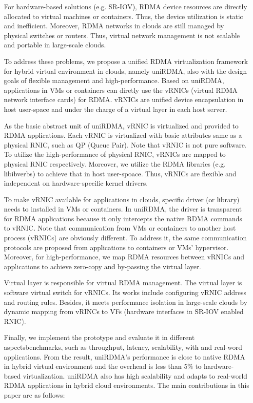 For hardware-based solutions (e.g. SR-IOV), RDMA device resources are directly allocated to virtual machines or containers. Thus, the device utilization is static and inefficient. Moreover, RDMA networks in clouds are still managed by physical switches or routers. Thus, virtual network management is not scalable and portable in large-scale clouds.

To address these problems, we propose a unified RDMA virtualization framework for hybrid virtual environment in clouds, namely uniRDMA, also with the design goals of flexible management and high-performance. Based on uniRDMA, applications in VMs or containers can diretly use the vRNICs (virtual RDMA network interface cards) for RDMA. vRNICs are unified device encapsulation in host user-space and under the charge of a virtual layer in each host server.

As the basic abstract unit of uniRDMA, vRNIC is virtualized and provided to RDMA applications. Each vRNIC is virtualized with basic attributes same as a physical RNIC, such as QP (Queue Pair). Note that vRNIC is not pure software. To utilize the high-performance of physical RNIC, vRNICs are mapped to physical RNIC respectively. Moreover, we utilize the RDMA libraries (e.g. libibverbs) to achieve that in host user-spoace. Thus, vRNICs are flexible and independent on hardware-specific kernel drivers. 

To make vRNIC available for applications in clouds, specific driver (or library) needs to installed in VMs or containers. In uniRDMA, the driver is transparent for RDMA applications because it only intercepts the native RDMA commands to vRNIC. Note that communication from VMs or containers to another host process (vRNICs) are obviously different. To address it, the same communication protocols are proposed from applications to containers or VMs' hypervisor. Moreover, for high-performance, we map RDMA resources between vRNICs and applications to achieve zero-copy and by-passing the virtual layer.

Virtual layer is responsible for virtual RDMA management. The virtual layer is software virtual switch for vRNICs. Its works include configuring vRNIC address and routing rules. Besides, it meets performance isolation in large-scale clouds by dynamic mapping from vRINCs to VFs (hardware interfaces in SR-IOV enabled RNIC).  

Finally, we implement the prototype and evaluate it in different aspectsbenchmarks, such as throughput, latency, scalability, with and real-word applications. From the result, uniRDMA's performance is close to native RDMA in hybrid virtual environment and the overhead is less than 5\% to hardware-based virtualization. uniRDMA also has high scalability and adapts to real-world RDMA applications in hybrid cloud environments. The main contributions in this paper are as follows:

